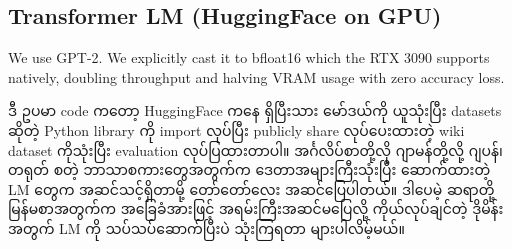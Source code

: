 \documentclass[11pt]{article}
\begin{document}
    \hypertarget{transformer-lm-huggingface-on-gpu}{%
\subsection{Transformer LM (HuggingFace on
GPU)}\label{transformer-lm-huggingface-on-gpu}}

We use GPT-2. We explicitly cast it to bfloat16 which the RTX 3090
supports natively, doubling throughput and halving VRAM usage with zero
accuracy loss.

{\burmesefont ဒီ} {\burmesefont ဥပမာ} code {\burmesefont ကတော့} HuggingFace {\burmesefont ကနေ} {\burmesefont ရှိပြီးသား} {\burmesefont မော်ဒယ်ကို} {\burmesefont ယူသုံးပြီး} datasets {\burmesefont ဆိုတဲ့}
Python library {\burmesefont ကို} import {\burmesefont လုပ်ပြီး} publicly share {\burmesefont လုပ်ပေးထားတဲ့} wiki dataset
{\burmesefont ကိုသုံးပြီး} evaluation {\burmesefont လုပ်ပြထားတာပါ။} {\burmesefont အင်္ဂလိပ်စာတို့လို} {\burmesefont ဂျာမန်တို့လို့} {\burmesefont ဂျပန်၊} {\burmesefont တရုတ်} {\burmesefont စတဲ့}
{\burmesefont ဘာသာစကားတွေအတွက်က} {\burmesefont ဒေတာအများကြီးသုံးပြီး} {\burmesefont ဆောက်ထားတဲ့} LM {\burmesefont တွေက} {\burmesefont အဆင်သင့်ရှိတာမို့} {\burmesefont တော်တော်လေး}
{\burmesefont အဆင်ပြေပါတယ်။} {\burmesefont ဒါပေမဲ့} {\burmesefont ဆရာတို့} {\burmesefont မြန်မစာအတွက်က} {\burmesefont အခြေခံအားဖြင့်} {\burmesefont အရမ်းကြီးအဆင်မပြေလို့} {\burmesefont ကိုယ်လုပ်ချင်တဲ့}
{\burmesefont ဒိုမိန်းအတွက်} LM {\burmesefont ကို} {\burmesefont သပ်သပ်ဆောက်ပြီးပဲ} {\burmesefont သုံးကြရတာ} {\burmesefont များပါလိမ့်မယ်။}
\end{document}
